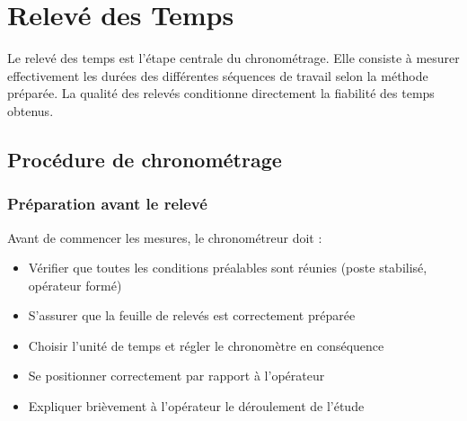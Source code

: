 \documentclass[a4paper,12pt]{article}
\begin{document}
\begin{center}
\end{center}


\section{Relevé des Temps}

Le relevé des temps est l'étape centrale du chronométrage. Elle consiste à mesurer effectivement les durées des différentes séquences de travail selon la méthode préparée. La qualité des relevés conditionne directement la fiabilité des temps obtenus.

\subsection{Procédure de chronométrage}

\subsubsection{Préparation avant le relevé}

Avant de commencer les mesures, le chronométreur doit :
\begin{itemize}
    \item Vérifier que toutes les conditions préalables sont réunies (poste stabilisé, opérateur formé)
    \item S'assurer que la feuille de relevés est correctement préparée
    \item Choisir l'unité de temps et régler le chronomètre en conséquence
    \item Se positionner correctement par rapport à l'opérateur
    \item Expliquer brièvement à l'opérateur le déroulement de l'étude
\end{itemize}
\end{document}
